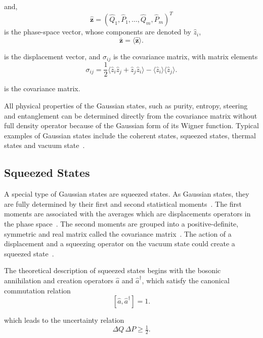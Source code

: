 \noindent
and,
\[
\hat{\mathbf{z}} = (\hat{Q}_{1}, \hat{P}_{1}, \ldots, \hat{Q}_{m}, \hat{P}_{m})^{T}
\]
is the phase-space vector, whose components are denoted by $\hat{z}_i$,
\begin{equation}
	\bar{\mathbf{z}} = \langle \hat{\mathbf{z}} \rangle .
	\label{eq:first_moments}
\end{equation}

is the displacement vector, and $\sigma_{ij}$ is the covariance matrix, with matrix elements\begin{equation}
	\sigma_{ij} =
	\frac{1}{2}\langle \hat{z}_{i}\hat{z}_{j} + \hat{z}_{j}\hat{z}_{i} \rangle
	- \langle \hat{z}_{i} \rangle \langle \hat{z}_{j} \rangle .
	\label{eq:covariance_matrix}
\end{equation}

is the covariance matrix.





All physical properties of the Gaussian states, such as purity, entropy, steering and entanglement can be determined directly from the covariance matrix without full density operator because of the Gaussian form of its Wigner function.
Typical examples of Gaussian states include the coherent states, squeezed states, thermal states and vacuum state~\cite{Weedbrook2012,AdessoRagyLee2014}.


\subsection{Squeezed States}

A special type of Gaussian states are squeezed states. As Gaussian states, they are fully determined by their first and second statistical moments~\cite{Weedbrook2012,AdessoRagyLee2014}. The first moments are associated with the averages  which are displacements operators in the phase space~\cite{Weedbrook2012}. The second moments are grouped into a positive-definite, symmetric and real matrix called the covariance matrix~\cite{Weedbrook2012,AdessoRagyLee2014}. The action of a displacement and a squeezing operator on the vacuum state could create a squeezed  state~\cite{AdessoRagyLee2014}.


The theoretical description of squeezed states begins with the bosonic annihilation and creation operators $\hat{a}$ and $\hat{a}^\dagger$, which satisfy the canonical commutation relation
\[
[\hat{a},\hat{a}^\dagger]=1.
\]

which leads to the uncertainty relation\cite{Walls1983,AdessoRagyLee2014}
\[
\Delta Q\,\Delta P \ge \tfrac{1}{2}.
\]

